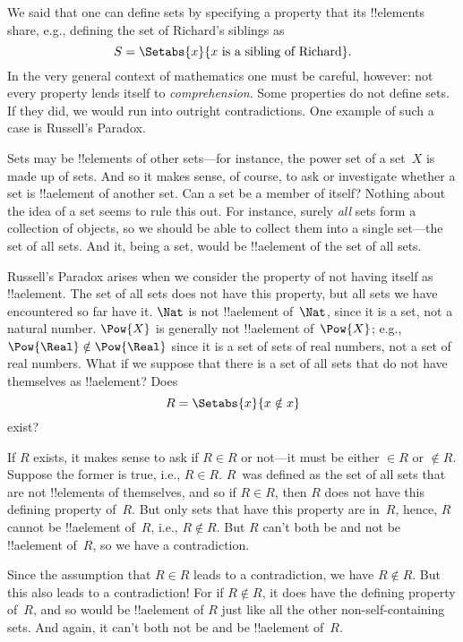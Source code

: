 \documentclass[../../../include/open-logic-section]{subfiles}
\begin{document}

We said that one can define sets by specifying a property that its
!!{element}s share, e.g., defining the set of Richard's siblings as
\[
S = \Setabs{x}{x \text{ is a sibling of Richard}}.
\]
In the very general context of mathematics one must be careful,
however: not every property lends itself to \emph{comprehension}. Some
properties do not define sets. If they did, we would run into
outright contradictions. One example of such a case is Russell's
Paradox.

Sets may be !!{element}s of other sets---for instance, the power set
of a set~$X$ is made up of sets. And so it makes sense, of course, to
ask or investigate whether a set is !!a{element} of another set. Can
a set be a member of itself?  Nothing about the idea of a set seems to
rule this out. For instance, surely \emph{all} sets form a collection
of objects, so we should be able to collect them into a single
set---the set of all sets. And it, being a set, would be !!a{element}
of the set of all sets.

Russell's Paradox arises when we consider the property of not having
itself as !!a{element}. The set of all sets does not have this
property, but all sets we have encountered so far have it. $\Nat$ is
not !!a{element} of~$\Nat$, since it is a set, not a natural
number. $\Pow{X}$ is generally not !!a{element} of~$\Pow{X}$; e.g.,
$\Pow{\Real} \notin \Pow{\Real}$ since it is a set of sets of real
numbers, not a set of real numbers. What if we suppose that there is
a set of all sets that do not have themselves as !!a{element}? Does
\[
R = \Setabs{x}{x \notin x}
\]
exist?

If $R$ exists, it makes sense to ask if $R \in R$ or not---it must be
either $\in R$ or $\notin R$. Suppose the former is true, i.e., $R \in
R$. $R$~was defined as the set of all sets that are not !!{element}s
of themselves, and so if $R \in R$, then $R$ does not have this
defining property of~$R$. But only sets that have this property are
in~$R$, hence, $R$ cannot be !!a{element} of~$R$, i.e., $R \notin
R$. But $R$ can't both be and not be !!a{element} of~$R$, so we have a
contradiction.

Since the assumption that $R \in R$ leads to a contradiction, we have
$R \notin R$. But this also leads to a contradiction!{} For if $R
\notin R$, it does have the defining property of~$R$, and so would be
!!a{element} of $R$ just like all the other non-self-containing sets.
And again, it can't both not be and be !!a{element} of~$R$.
\end{document}
